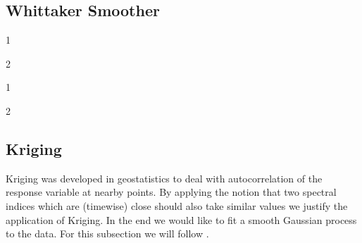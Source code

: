 \subsection{Whittaker Smoother}
\label{sec:whittaker}
\begin{my_pros_cons_table}{
    \item 1
    \item 2
  }{
    \item 1
    \item 2
  }
\end{my_pros_cons_table}


\subsection{Kriging}
\label{sec:Kriging}

Kriging was developed in geostatistics to deal with autocorrelation of the response variable at nearby points. By applying the notion that two spectral indices which are (timewise) close should also take similar values we justify the application of Kriging. In the end we would like to fit a smooth Gaussian process to the data. For this subsection we will follow \cite{diggleGaussianModelsGeostatistical2007}.

